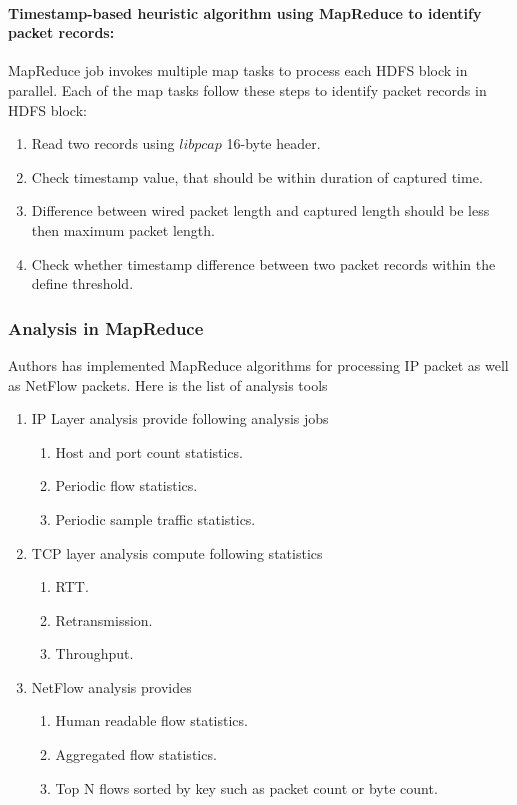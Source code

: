       \paragraph{Timestamp-based heuristic algorithm using MapReduce to identify packet records:}
	MapReduce job invokes multiple map tasks to process each HDFS block in parallel. Each of the map tasks follow these steps to
	identify packet records in HDFS block:
	\begin{enumerate}
	 \item Read two records using $libpcap$ 16-byte header.
	 \item Check timestamp value, that should be within duration of captured time.
	 \item Difference between wired packet length and captured length should be less then maximum packet length.
	 \item Check whether timestamp difference between two packet records within the define threshold. 
	\end{enumerate}
	
	\subsubsection{Analysis in MapReduce}
	Authors has implemented  MapReduce algorithms for processing IP packet as well as NetFlow packets.
	Here is the list of analysis tools
	\begin{enumerate}
	 \item IP Layer analysis provide following analysis jobs
	      \begin{enumerate}
	       \item Host and port count statistics.
	       \item Periodic flow statistics.
	       \item Periodic sample traffic statistics.
	      \end{enumerate}
	 \item TCP layer analysis compute following statistics
	       \begin{enumerate}
	        \item RTT.
	        \item Retransmission.
	        \item Throughput.
	       \end{enumerate}
	\item NetFlow analysis provides 
	      \begin{enumerate}
	       \item Human readable flow statistics.
	       \item Aggregated flow statistics.
	       \item Top N flows sorted by key such as packet count or byte count. 
	      \end{enumerate}

	\end{enumerate}


